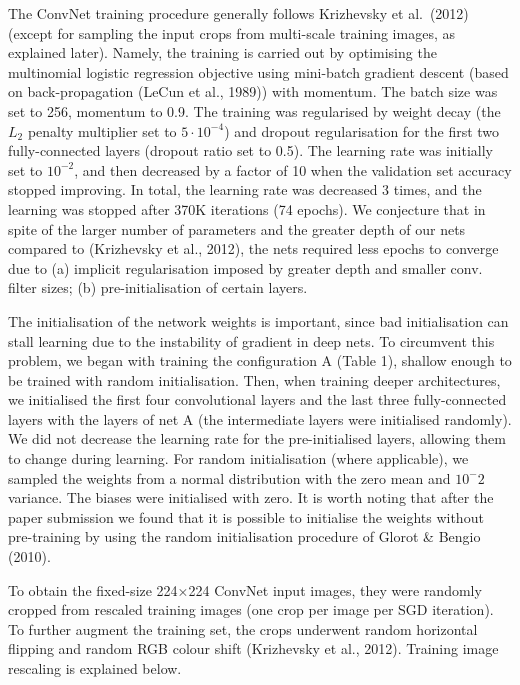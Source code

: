 \documentclass[12pt,a4paper,UTF8,twoside]{book}
\begin{document}
The ConvNet training procedure generally follows Krizhevsky et al.~(2012) (except for sampling the input crops from multi-scale training images, as explained later). Namely, the training is carried out by optimising the multinomial logistic regression objective using mini-batch gradient descent (based on back-propagation (LeCun et al., 1989)) with momentum. The batch size was set to 256, momentum to 0.9. The training was regularised by weight decay (the \(L_2\) penalty multiplier set to \(5 · 10^{−4}\)) and dropout regularisation for the first two fully-connected layers (dropout ratio set to 0.5). The learning rate was initially set to \(10^{−2}\), and then decreased by a factor of 10 when the validation set accuracy stopped improving. In total, the learning rate was decreased 3 times, and the learning was stopped after 370K iterations (74 epochs). We conjecture that in spite of the larger number of parameters and the greater depth of our nets compared to (Krizhevsky et al., 2012), the nets required less epochs to converge due to (a) implicit regularisation imposed by greater depth and smaller conv. filter sizes; (b) pre-initialisation of certain layers.

The initialisation of the network weights is important, since bad initialisation can stall learning due to the instability of gradient in deep nets. To circumvent this problem, we began with training the configuration A (Table 1), shallow enough to be trained with random initialisation. Then, when training deeper architectures, we initialised the first four convolutional layers and the last three fully-connected layers with the layers of net A (the intermediate layers were initialised randomly). We did not decrease the learning rate for the pre-initialised layers, allowing them to change during learning. For random initialisation (where applicable), we sampled the weights from a normal distribution with the zero mean and \(10^−2\) variance. The biases were initialised with zero. It is worth noting that after the paper submission we found that it is possible to initialise the weights without pre-training by using the random initialisation procedure of Glorot \& Bengio (2010).

To obtain the fixed-size 224×224 ConvNet input images, they were randomly cropped from rescaled training images (one crop per image per SGD iteration). To further augment the training set, the crops underwent random horizontal flipping and random RGB colour shift (Krizhevsky et al., 2012). Training image rescaling is explained below.
\end{document}
